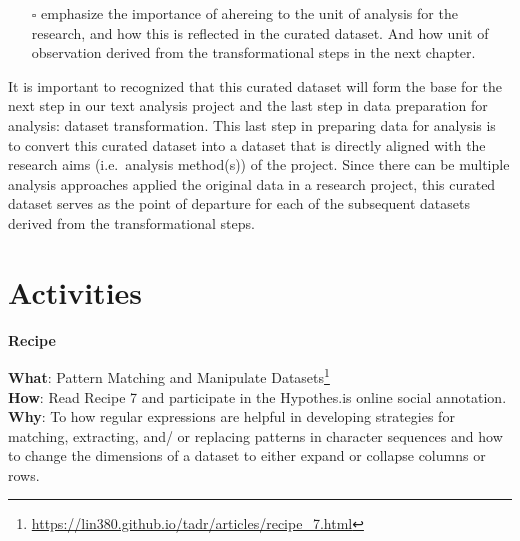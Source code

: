 \documentclass[
  letterpaper,
  DIV=11,
  numbers=noendperiod]{scrreport}
\providecommand{\tightlist}{%
  \setlength{\itemsep}{0pt}\setlength{\parskip}{0pt}}\usepackage{longtable,booktabs,array}
\theoremstyle{definition}
\theoremstyle{remark}
\DeclareRobustCommand{\href}[2]{#2\footnote{\url{#1}}}
\begin{document}
\begin{itemize}
\tightlist
\item[$\square$]
  emphasize the importance of ahereing to the unit of analysis for the
  research, and how this is reflected in the curated dataset. And how
  unit of observation derived from the transformational steps in the
  next chapter.
\end{itemize}

It is important to recognized that this curated dataset will form the
base for the next step in our text analysis project and the last step in
data preparation for analysis: dataset transformation. This last step in
preparing data for analysis is to convert this curated dataset into a
dataset that is directly aligned with the research aims (i.e.~analysis
method(s)) of the project. Since there can be multiple analysis
approaches applied the original data in a research project, this curated
dataset serves as the point of departure for each of the subsequent
datasets derived from the transformational steps.

\hypertarget{activities-4}{%
\section*{Activities}\label{activities-4}}


\begin{tcolorbox}[enhanced jigsaw, breakable, arc=.35mm, leftrule=.75mm, rightrule=.15mm, colback=white, toprule=.15mm, bottomrule=.15mm, opacityback=0, left=2mm]

\textbf{ Recipe}

\textbf{What}:
\href{https://lin380.github.io/tadr/articles/recipe_7.html}{Pattern
Matching and Manipulate Datasets}\\
\textbf{How}: Read Recipe 7 and participate in the Hypothes.is online
social annotation.\\
\textbf{Why}: To how regular expressions are helpful in developing
strategies for matching, extracting, and/ or replacing patterns in
character sequences and how to change the dimensions of a dataset to
either expand or collapse columns or rows.

\end{tcolorbox}
\end{document}
